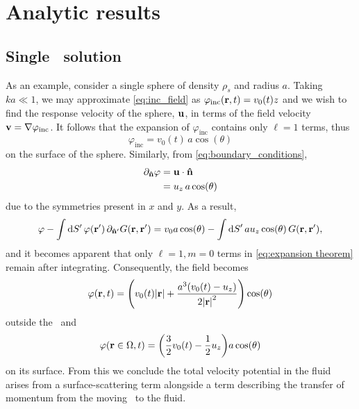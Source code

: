 \section{Analytic results}

\subsection{Single \bubble\ solution}

As an example, consider a single sphere of density $\rho_s$ and radius $a$.
Taking $k a \ll 1$, we may approximate \cref{eq:inc_field} as $\varphi_\text{inc}(\vb{r}, t) = v_0(t) z$ and we wish to find the response velocity of the sphere, $\vb{u}$, in terms of the field velocity $\vb{v} = \nabla \varphi_\text{inc}$. It follows that the expansion of $\varphi_\text{inc}$ contains only $\ell = 1$ terms, thus
\begin{equation}
  \label{eq:uniform field}
  \varphi_\text{inc} = v_0(t) \, a \cos(\theta)
\end{equation}
on the surface of the sphere. Similarly, from \cref{eq:boundary_conditions},
\begin{align}
  \partial_{\vu{n}} \varphi &= \vb{u} \cdot \vu{n} \nonumber \\
                            &= u_z \, a \cos(\theta)
\end{align}
due to the symmetries present in $x$ and $y$.
As a result,
\begin{equation}
    \varphi - \int \dd{S'} \varphi(\vb{r}') \, \partial_{\vu{n}'} G(\vb{r}, \vb{r}') = v_0 a \cos(\theta) - \int \dd{S}' a u_z \cos(\theta) \, G(\vb{r}, \vb{r}'),
\end{equation}
and it becomes apparent that only $\ell = 1, m = 0$ terms in \cref{eq:expansion theorem} remain after integrating.
Consequently, the field becomes
\begin{equation}
  \label{eq:dipole}
  \varphi(\vb{r}, t) = \qty(v_0(t) \abs{\vb{r}} + \frac{a^3\qty(v_0(t) - u_z)}{2\abs{\vb{r}}^2})\cos(\theta)
\end{equation}
outside the \bubble\ and
\begin{equation}
  \varphi(\vb{r} \in \Omega, t) = \qty(\frac{3}{2}v_0(t) - \frac{1}{2} u_z)a \cos(\theta)
\end{equation}
on its surface.
From this we conclude the total velocity potential in the fluid arises from a surface-scattering term alongside a term describing the transfer of momentum from the moving \bubble\ to the fluid.

